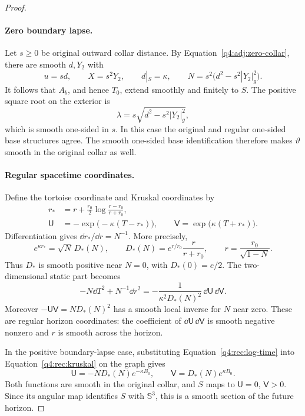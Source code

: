 \begin{proof}
\paragraph{Zero boundary lapse.}
Let $s\geq0$ be original outward collar distance.  By
Equation~\eqref{q4:adj:zero-collar}, there are smooth $d,Y_2$ with
\begin{equation}
 u=sd,\qquad X=s^2Y_2,\qquad d|_S=\kappa,\qquad
 N=s^2\bigl(d^2-s^2|Y_2|_g^2\bigr).
 \label{q4:rec:zero-collar}
\end{equation}
It follows that $A_b$, and hence $T_0$, extend smoothly and finitely to $S$.
The positive square root on the exterior is
\[
 \lambda=s\sqrt{d^2-s^2|Y_2|_g^2},
\]
which is smooth one-sided in $s$.  In this case the original and regular
one-sided base structures agree.  The smooth one-sided base identification
therefore makes $\vartheta$ smooth in the original collar as well.

\paragraph{Regular spacetime coordinates.}
Define the tortoise coordinate and Kruskal coordinates by
\begin{equation}
 \begin{split}
 r_*&=r+\frac{r_0}{2}\log\frac{r-r_0}{r+r_0},\\
 \mathsf U&=-\exp\bigl(-\kappa(T-r_*)\bigr),\qquad
 \mathsf V=\exp\bigl(\kappa(T+r_*)\bigr).
 \end{split}
 \label{q4:rec:kruskal}
\end{equation}
Differentiation gives $\dd r_*/\dd r=N^{-1}$.  More precisely,
\begin{equation}
 e^{\kappa r_*}=\sqrt N\,D_*(N),\qquad
 D_*(N)=e^{r/r_0}\frac{r}{r+r_0},\qquad
 r=\frac{r_0}{\sqrt{1-N}}.
 \label{q4:rec:regular-factor}
\end{equation}
Thus $D_*$ is smooth positive near $N=0$, with $D_*(0)=e/2$.
The two-dimensional static part becomes
\[
 -N\dd T^2+N^{-1}\dd r^2
   =-\frac{1}{\kappa^2D_*(N)^2}\,\dd\mathsf U\,\dd\mathsf V.
\]
Moreover $-\mathsf U\mathsf V=N D_*(N)^2$ has a smooth local inverse for
$N$ near zero.  These are regular horizon coordinates: the coefficient of
$\dd\mathsf U\,\dd\mathsf V$ is smooth negative nonzero and $r$ is smooth
across the horizon.

In the positive boundary-lapse case, substituting
Equation~\eqref{q4:rec:log-time} into Equation~\eqref{q4:rec:kruskal} on the graph
gives
\begin{equation}
 \mathsf U=-N D_*(N)e^{-\kappa B_0},\qquad
 \mathsf V=D_*(N)e^{\kappa B_0}.
 \label{q4:rec:future-section}
\end{equation}
Both functions are smooth in the original collar, and $S$ maps to
$\mathsf U=0$, $\mathsf V>0$.  Since its angular map identifies $S$ with
$\mathbb S^3$, this is a smooth section of the future horizon.


\end{proof}
